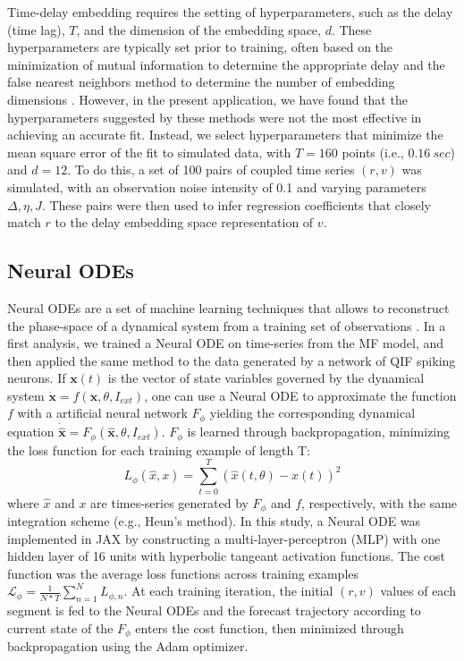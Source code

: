 \documentclass[preprint,11pt,authoryear]{elsarticle}
\begin{document}
Time-delay embedding requires the setting of hyperparameters, such as the delay (time lag), $T$, and  the dimension of the embedding space, $d$. These hyperparameters are typically set prior to training, often based on the minimization of mutual information to determine the appropriate delay and the false nearest neighbors method to determine the number of embedding dimensions \citep{Kennel1992, Tan2023}. However, in the present application, we have found that the hyperparameters suggested by these methods were not the most effective in achieving an accurate fit. Instead, we select hyperparameters that minimize the mean square error of the fit to simulated data, with $T=160$ points (i.e., $0.16~sec$) and $d=12$. To do this, a set of 100 pairs of coupled time series $(r, v)$ was simulated, with an observation noise intensity of 0.1 and varying parameters $\Delta, \eta, J$. These pairs were then used to infer regression coefficients that closely match $r$ to the delay embedding space representation of $v$.




\subsection{Neural ODEs}

Neural ODEs are a set of machine learning techniques that allows to reconstruct the phase-space of a dynamical system from a training set of observations \citep{Chen2018}. In a first analysis, we trained a Neural ODE on time-series from the MF model, and then applied the same method to the data generated by a network of QIF spiking neurons. If $\textbf{x}(t)$ is the vector of state variables governed by the dynamical system $\dot{\textbf{x}} = f(\textbf{x}, \theta,I_{ext})$, one can use a Neural ODE to approximate the function $f$ with a artificial neural network $F_{\phi}$ yielding the corresponding dynamical equation $\dot{\hat{\textbf{x}}} = F_{\phi}(\hat{\textbf{x}},\theta,I_{ext})$. $F_{\phi}$ is learned through backpropagation, minimizing the loss function for each training example of length T: 
\[L_{\phi}(\hat{x},x)={\sum_{t=0}^{T}(\hat{x}(t, \theta)-x(t))^2}\]
where $\hat{x}$ and $x$ are times-series generated by $F_{\phi}$ and $f$,  respectively, with the same integration scheme (e.g., Heun's method). In this study, a Neural ODE was implemented in JAX \citep{jax2018github} by constructing a multi-layer-perceptron (MLP) with one hidden layer of 16 units with hyperbolic tangeant activation functions. The cost function was the average loss functions across training examples $\mathcal{L_{\phi}}=\frac{1}{N*T}\sum_{n=1}^{N}L_{\phi,n}$. 
At each training iteration, the initial $(r, v)$ values of each segment is fed to the Neural ODEs and the forecast trajectory according to current state of the $F_{\phi}$ enters the cost function, then minimized through backpropagation using the Adam optimizer. 
\end{document}
